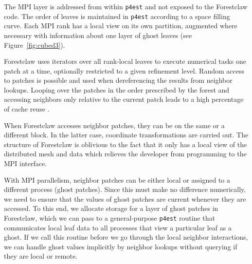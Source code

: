 \documentclass{IOS-Book-Article}     %
\newcommand{\comment}[1]{\textcolor{green}{[DAC: #1]}\xspace}
\newcommand{\cO}{\mathcal{O}}
\newcommand{\forestclaw}{Forestclaw\xspace}
\newcommand{\pforest}{\texttt{p4est}\xspace}
\newcommand{\Fig}[1]{Figure~\ref{fig:#1}}
\newcommand{\alert}[1]{{\color{red}#1}}
\begin{document}
The MPI layer is addressed from within \pforest and not exposed to the
\forestclaw code.  The order of leaves is maintained in \pforest according to a
space filling curve.  Each MPI rank has a local view on its own partition,
augmented where necessary with information about one layer of ghost leaves
(see \Fig{cubed3}).

\forestclaw uses iterators over all rank-local leaves to execute numerical
tasks one patch at a time, optionally restricted to a given refinement level.
Random access to patches is possible and used when dereferencing the results
from
neighbor lookups.  Looping over the patches in the order
prescribed by the forest
and
accessing neighbors only relative to the current patch leads to a high
percentage of cache reuse
\cite{BursteddeBurtscherGhattasEtAl09}.

When \forestclaw accesses neighbor patches, they can be on the same or a
different block.  In the latter case, coordinate transformations are carried
out.  The structure of \forestclaw is oblivious to the fact that it only has a
local view of the distributed mesh and data which relieves the developer from
programming to the MPI interface.

With MPI parallelism, neighbor patches can be either local or assigned to a
different process (ghost patches).  Since this must make no difference
numerically, we need to ensure that the values of ghost patches are current
whenever they are accessed.  To this end, we allocate storage for a layer of
ghost patches in \forestclaw, which we can pass to a general-purpose \pforest
routine that communicates local leaf data to all processes that view a
particular leaf as a ghost.  If we call this routine before we go through the
local neighbor interactions, we can handle ghost values implicitly by neighbor
lookups without querying if they are local or remote.

\end{document}
